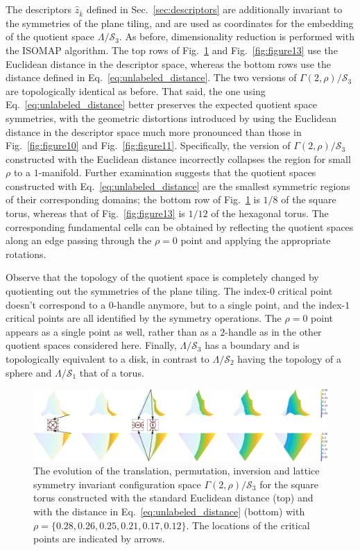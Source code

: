 \documentclass[default,iicol]{sn-jnl}%
\theoremstyle{thmstyleone}%
\theoremstyle{thmstyletwo}%
\theoremstyle{thmstylethree}%
\renewcommand{\vec}[1]{\bar{#1}}
\begin{document}
The descriptors $\hat{z}_{\vec{k}}$ defined in Sec.\ \ref{sec:descriptors} are additionally invariant to the symmetries of the plane tiling, and are used as coordinates for the embedding of the quotient space $\Lambda / \mathcal{S}_3$. As before, dimensionality reduction is performed with the ISOMAP algorithm. The top rows of Fig.\ \ref{fig:figure12} and Fig.\ \ref{fig:figure13} use the Euclidean distance in the descriptor space, whereas the bottom rows use the distance defined in Eq.\ \ref{eq:unlabeled_distance}. The two versions of $\Gamma(2, \rho) / \mathcal{S}_3$ are topologically identical as before. That said, the one using Eq.\ \ref{eq:unlabeled_distance} better preserves the expected quotient space symmetries, with the geometric distortions introduced by using the Euclidean distance in the descriptor space much more pronounced than those in Fig.\ \ref{fig:figure10} and Fig.\ \ref{fig:figure11}. Specifically, the version of $\Gamma(2, \rho) / \mathcal{S}_3$ constructed with the Euclidean distance incorrectly collapses the region for small $\rho$ to a $1$-manifold. Further examination suggests that the quotient spaces constructed with Eq.\ \ref{eq:unlabeled_distance} are the smallest symmetric regions of their corresponding domains; the bottom row of Fig.\ \ref{fig:figure12} is $1 / 8$ of the square torus, whereas that of Fig.\ \ref{fig:figure13} is $1 / 12$ of the hexagonal torus. The corresponding fundamental cells can be obtained by reflecting the quotient spaces along an edge passing through the $\rho = 0$ point and applying the appropriate rotations.

Observe that the topology of the quotient space is completely changed by quotienting out the symmetries of the plane tiling. The index-$0$ critical point doesn't correspond to a $0$-handle anymore, but to a single point, and the index-$1$ critical points are all identified by the symmetry operations. The $\rho = 0$ point appears as a single point as well, rather than as a $2$-handle as in the other quotient spaces considered here. Finally, $\Lambda / \mathcal{S}_3$ has a boundary and is topologically equivalent to a disk, in contrast to $\Lambda / \mathcal{S}_2$ having the topology of a sphere and $\Lambda / \mathcal{S}_1$ that of a torus.

\begin{figure}
	\centering
	\includegraphics[width=1.0\textwidth]{figure12.eps}
	\caption{The evolution of the translation, permutation, inversion and lattice symmetry invariant configuration space $\Gamma(2, \rho) / \mathcal{S}_3$ for the square torus constructed with the standard Euclidean distance (top) and with the distance in Eq.\ \ref{eq:unlabeled_distance} (bottom) with $\rho=\{0.28, 0.26, 0.25, 0.21, 0.17, 0.12\}$. The locations of the critical points are indicated by arrows.}
	\label{fig:figure12}
\end{figure}
\end{document}

